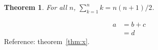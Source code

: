 \documentclass{article}
\newtheorem{theorem}{Theorem}
\begin{document}
\begin{theorem}\label{thm:x}
For all $n$, $\sum_{k=1}^n k = n(n+1)/2$.
\end{theorem}
\begin{align}
a &= b + c \\
  &= d
\end{align}
Reference: theorem~\eqref{thm:x}.
\end{document}
